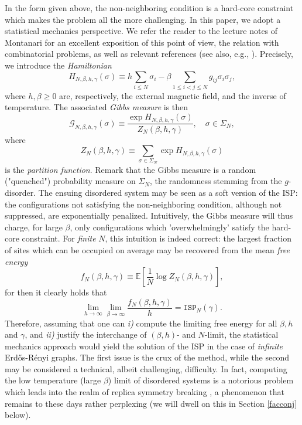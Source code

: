 \documentclass[a4paper,12pt,oneside,reqno]{amsart}
\numberwithin{equation}{section}
\begin{document}
In the form given above, the non-neighboring condition is a hard-core constraint which makes the problem 
all the more challenging. In this paper, we adopt a statistical mechanics perspective. We refer the reader to the lecture notes of Montanari \cite{montanari} for an excellent exposition of this point of view, the relation with combinatorial problems, as well as relevant references (see also, e.g., \cite{desanctis_guerra}). Precisely, we introduce the {\it Hamiltonian} 
\begin{equation} \label{ham}
H_{N, {\beta}, h, \gamma}({\sigma}) {\equiv} h \sum_{i\leq N} {\sigma}_i - {\beta} \sum_{1\leq i<j\leq N} g_{ij} {\sigma}_i {\sigma}_j, 
\end{equation}
where $h, {\beta} \geq 0$ are, respectively, the external magnetic field, and the inverse of temperature. The associated {\it Gibbs measure}  is then
\begin{equation}
\mathcal G_{N, {\beta}, h, \gamma}({\sigma}) {\equiv} \frac{\exp H_{N, {\beta}, h, \gamma}({\sigma})}{Z_N({\beta}, h, \gamma)}, \quad {\sigma} \in \Sigma_N, 
\end{equation}
where 
\begin{equation}\label{part_func}
Z_N({\beta}, h, \gamma) {\equiv} \sum_{{\sigma}\in \Sigma_N} \exp H_{N, {\beta}, h, \gamma}({\sigma})
\end{equation} 
is the {\it partition function}. Remark that the Gibbs measure is a random ("quenched") probability measure on $\Sigma_N$, the randomness stemming from the $g$-disorder.  The ensuing disordered system may be seen as a soft version of the ISP:  the configurations not satisfying the non-neighboring condition, although not suppressed, are exponentially penalized. Intuitively, the Gibbs measure will thus charge, for large ${\beta}$, only configurations which 'overwhelmingly' satisfy the hard-core constraint.  For {\it finite} $N$, this intuition is indeed correct: the largest fraction of sites which can be occupied on average may be recovered from the mean {\it free energy}
\begin{equation} \label{free_energ}
f_N({\beta}, h, \gamma) {\equiv} {{\mathbb{E}}}\left[ \frac{1}{N} \log Z_N({\beta}, h, \gamma) \right],
\end{equation}
for then it clearly holds that 
\begin{equation} 
 \lim_{h \to \infty}\lim_{{\beta} \to \infty} \frac{f_N({\beta}, h, \gamma)}{h}   = \texttt{ISP}_N(\gamma). 
\end{equation}
Therefore, assuming that one can {\it i)} compute the limiting free energy for all $\beta, h$ and $\gamma$, and {\it ii)} justify the interchange of $({\beta}, h)$- and $N$-limit, the statistical mechanics approach would yield the solution of 
the ISP in the case of {\it infinite} Erd\H{o}s-R\'{e}nyi graphs. The first issue is the crux of the method, while the second may be considered a technical, albeit challenging, difficulty. In fact, computing the low temperature (large ${\beta}$) limit of disordered systems is a notorious problem which leads into the realm of replica symmetry breaking \cite{parisi}, a phenomenon that remains to these days rather perplexing (we will dwell on this in Section \ref{facconj} below). 
\end{document}
